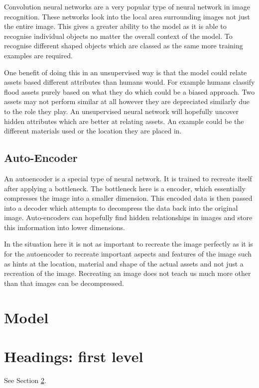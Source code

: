 \documentclass{article}
\begin{document}
Convolution neural networks are a very popular type of neural network in image recognition. These networks look into the local area surrounding images not just the entire image. This gives a greater ability to the model as it is able to recognise individual objects no matter the overall context of the model. To recognise different shaped objects which are classed as the same more training examples are required.

One benefit of doing this in an unsupervised way is that the model could relate assets based different attributes than humans would. For example humans classify flood assets purely based on what they do which could be a biased approach. Two assets may not perform similar at all however they are depreciated similarly due to the role they play. An unsupervised neural network will hopefully uncover hidden attributes which are better at relating assets. An example could be the different materials used or the location they are placed in.

\subsection{Auto-Encoder}
\label{ss:ae}
An autoencoder is a special type of neural network. It is trained to recreate itself after applying a bottleneck. The bottleneck here is a encoder, which essentially compresses the image into a smaller dimension. This encoded data is then passed into a decoder which attempts to decompress the data back into the original image. Auto-encoders can hopefully find hidden relationships in images and store this imformation into lower dimensions.

In the situation here it is not as important to recreate the image perfectly as it is for the autoencoder to recreate important aspects and features of the image such as hints at the location, material and shape of the actual assets and not just a recreation of the image. Recreating an image does not teach us much more other than that images can be decompressed.

\section{Model}

\section{Headings: first level}
\label{sec:headings}

\lipsum[4] See Section \ref{sec:headings}.
\end{document}
